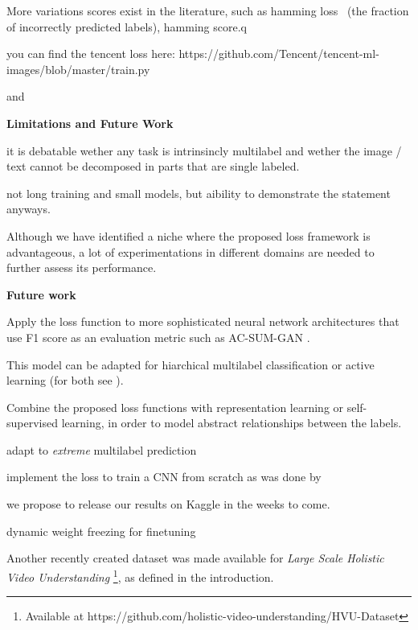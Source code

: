 
More variations scores exist in the literature, such as hamming loss~\cite{hammingLoss} (the fraction of incorrectly predicted labels), hamming score.q

you can find the tencent loss here: https://github.com/Tencent/tencent-ml-images/blob/master/train.py


 \cite{lossComp}

 \cite{MLTSVM} and \cite{MLTSVMThreeway}




\textbf{Limitations and Future Work}

it is debatable wether any task is intrinsincly multilabel and wether the image / text cannot be decomposed in parts that are single labeled.

not long training and small models, but aibility to demonstrate the statement anyways.

Although we have identified a niche where the proposed loss framework is advantageous, a lot of experimentations in different domains are needed to further assess its performance.

\textbf{Future work}

Apply the loss function to more sophisticated neural network architectures that use F1 score as an evaluation metric such as AC-SUM-GAN \cite{AC-SUM-GAN}.

This model can be adapted for hiarchical multilabel classification \cite{HARAM} or active learning (for both see \cite{activeLearningMultiLabel}).

Combine the proposed loss functions with representation learning \cite{unsupervisedImage,highResRepresentation} or self-supervised learning, in order to model abstract relationships between the labels.

adapt to \emph{extreme} multilabel prediction \cite{extremeMultilabelText}

implement the loss to train a CNN from scratch as was done by \cite{tencent}

we propose to release our results on Kaggle in the weeks to come.

dynamic weight freezing for finetuning~\cite{ULMFit}

Another recently created dataset was made available for \emph{Large Scale Holistic Video Understanding} \cite{holisticVideoData}\footnote{Available at https://github.com/holistic-video-understanding/HVU-Dataset}, as defined in the introduction.


